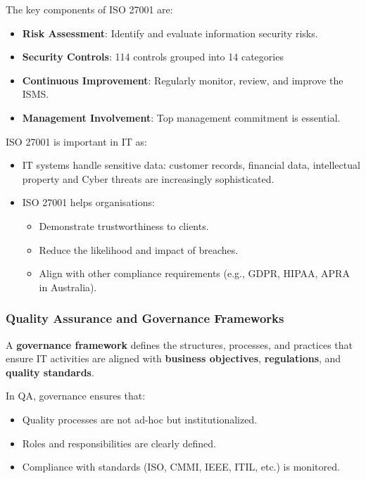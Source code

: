 \bigskip

\noindent The key components of ISO 27001 are:

\begin{itemize}
    \item \textbf{Risk Assessment}: Identify and evaluate information security risks.
    \item \textbf{Security Controls}: 114 controls grouped into 14 categories
    \item \textbf{Continuous Improvement}: Regularly monitor, review, and improve the ISMS.
    \item \textbf{Management Involvement}: Top management commitment is essential.
\end{itemize}

\bigskip

ISO 27001 is important in IT as:

\begin{itemize}
    \item IT systems handle sensitive data: customer records, financial data, intellectual property and Cyber threats are increasingly sophisticated.
    \item ISO 27001 helps organisations:
    \begin{itemize}
        \item Demonstrate trustworthiness to clients.
        \item Reduce the likelihood and impact of breaches.
        \item Align with other compliance requirements (e.g., GDPR, HIPAA, APRA in Australia).
    \end{itemize}
\end{itemize}

\subsubsection{Quality Assurance and Governance Frameworks}

\indent 

A \textbf{governance framework} defines the structures, processes, and practices that ensure IT activities are aligned with \textbf{business objectives}, \textbf{regulations}, and \textbf{quality standards}.

\bigskip 

In QA, governance ensures that:

\begin{itemize}
    \item Quality processes are not ad-hoc but institutionalized.
    \item Roles and responsibilities are clearly defined.
    \item Compliance with standards (ISO, CMMI, IEEE, ITIL, etc.) is monitored.
\end{itemize}

